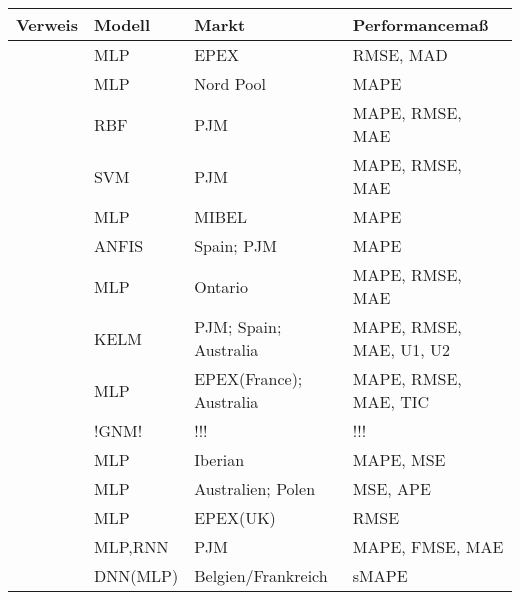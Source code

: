 \begin{table}[h]
\caption{}
\label{tab:ann_lit}
\begin{tabularx}{\textwidth}{llZZ}
\toprule
Verweis                 &  Modell   & Markt                     & Performancemaß            \\
\midrule
\citet{Keles2016}       & MLP       & EPEX                      & RMSE, MAD                 \\
\citet{Bobinaite2016}   & MLP       & Nord Pool                 & MAPE                      \\
\citet{Jiang2016}       & RBF       & PJM                       & MAPE, RMSE, MAE           \\
\citet{Feijoo2016}      & SVM       & PJM                       & MAPE, RMSE, MAE           \\
\citet{Monteiro2016}    & MLP       & MIBEL                     & MAPE                      \\
\citet{Osorio2016}      & ANFIS     & Spain; PJM                & MAPE                      \\
\citet{Sandhu2016}      & MLP       & Ontario                   & MAPE, RMSE, MAE           \\
\citet{Yang2017}        & KELM      & PJM; Spain; Australia     & MAPE, RMSE, MAE, U1, U2   \\
\citet{Wang2017}        & MLP       & EPEX(France); Australia   & MAPE, RMSE, MAE, TIC      \\
\citet{Singh2017}       & !GNM!       & !!!   & !!!      \\

\citet{Marcos2017}      & MLP       & Iberian                   & MAPE, MSE                 \\
\citet{Domanski2017}    & MLP       & Australien; Polen         & MSE, APE                  \\
\citet{Gao2017}         & MLP       & EPEX(UK)                  & RMSE                      \\
\citet{Mandal2017}      & MLP,RNN   & PJM                       & MAPE, FMSE, MAE           \\
\citet{Lago2018}        & DNN(MLP)  & Belgien/Frankreich        & sMAPE                     \\


\bottomrule
\end{tabularx}
\end{table}